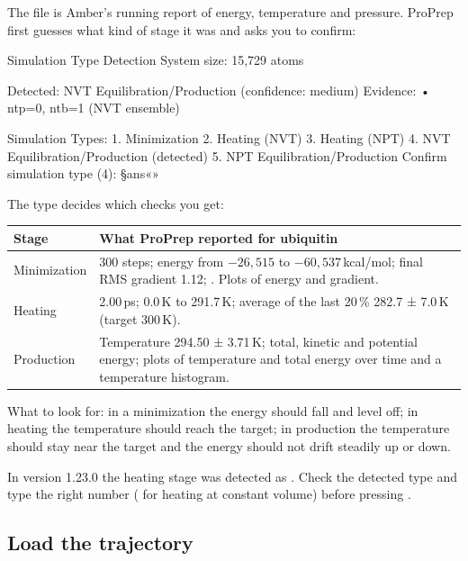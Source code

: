The  file is Amber's running report of energy, temperature and
pressure. ProPrep first guesses what kind of stage it was and asks you to
confirm:

\begin{screen}
Simulation Type Detection
System size: 15,729 atoms

Detected: NVT Equilibration/Production (confidence: medium)
Evidence:
  • ntp=0, ntb=1 (NVT ensemble)

Simulation Types:
  1. Minimization
  2. Heating (NVT)
  3. Heating (NPT)
  4. NVT Equilibration/Production (detected)
  5. NPT Equilibration/Production
Confirm simulation type (4): §ans«»
\end{screen}

The type decides which checks you get:

\begin{tabularx}{\linewidth}{@{}lL@{}}
\toprule
\textbf{Stage} & \textbf{What ProPrep reported for ubiquitin} \\
\midrule
Minimization & 300 steps; energy from $-26{,}515$ to $-60{,}537$\,kcal/mol;
  final RMS gradient 1.12; . Plots of energy
  and gradient. \\
Heating & 2.00\,ps; 0.0\,K to 291.7\,K; average of the last 20\,\%
  282.7 ± 7.0\,K (target 300\,K). \\
Production & Temperature 294.50 ± 3.71\,K; total, kinetic and potential
  energy; plots of temperature and total energy over time and a temperature
  histogram. \\
\bottomrule
\end{tabularx}

\medskip
What to look for: in a minimization the energy should fall and level off; in
heating the temperature should reach the target; in production the
temperature should stay near the target and the energy should not drift
steadily up or down.

\begin{watchout}
In version 1.23.0 the heating stage was detected as . Check the detected type and type the right number
( for heating at constant volume) before pressing .
\end{watchout}

\subsection{Load the trajectory}

